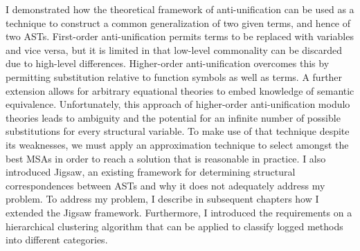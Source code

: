 I demonstrated how the theoretical framework of anti-unification can be used as a technique to construct a common generalization of two given terms, and hence of two ASTs.  First-order anti-unification permits terms to be replaced with variables and vice versa, but it is limited in that low-level commonality can be discarded due to high-level differences.  Higher-order anti-unification overcomes this by permitting substitution relative to function symbols as well as terms. A further extension allows for arbitrary equational theories to embed knowledge of semantic equivalence.  Unfortunately, this approach of higher-order anti-unification modulo theories leads to ambiguity and the potential for an infinite number of possible substitutions for every structural variable.  To make use of that technique despite its weaknesses, we must apply an approximation technique to select amongst the best MSAs in order to reach a solution that is reasonable in practice. I also introduced Jigsaw, an existing framework for determining structural correspondences between ASTs and why it does not adequately address my problem.  To address my problem, I describe in subsequent chapters how I extended the Jigsaw framework. Furthermore, I introduced the requirements on a hierarchical clustering algorithm that can be applied to classify logged methods into different categories.

